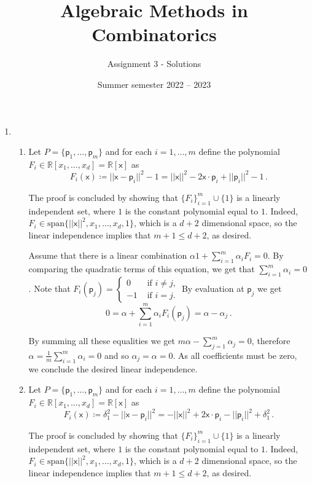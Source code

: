 \documentclass[kulak]{tplt}
\title{Algebraic Methods in Combinatorics}
\author{Assignment 3 - Solutions}
\date{Summer semester 2022 -- 2023}
\theoremstyle{definition}
\newcommand{\R}{\mathbb{R}}
\newcommand{\vx}{\mathsf{x}}
\newcommand{\vp}{\mathsf{p}}
\newcommand{\spn}{\mathrm{span}}
\begin{document}
\maketitle
\vspace{2mm}
\begin{enumerate}
\item 
\begin{enumerate}
\item
Let $P = \{\vp_1, \ldots, \vp_m \} $ and for each $i=1, \ldots, m$ define the polynomial $F_i \in \R[x_1, \ldots, x_d] = \R[\vx]$ as
$$ F_i ( \vx ) \coloneqq ||\vx - \vp_i ||^2 - 1  = ||\vx ||^2 - 2 \vx \cdot \vp_i + ||\vp_i||^2 - 1\, .$$

The proof is concluded by showing that $\{F_i\}_{i=1}^m \cup \{ 1 \}$ is a linearly independent set, where $1$ is the constant polynomial equal to $1$.
Indeed, $F_i \in \spn \{ ||\vx||^2, x_1, \ldots, x_d, 1\}$, which is a $d+2$ dimensional space, so the linear independence implies that $m+1 \leq d+2$, as desired.


Assume that there is a linear combination $\alpha 1 + \sum_{i=1}^m \alpha_i F_i = 0 $.
By comparing the quadratic terms of this equation, we get that $\sum_{i=1}^m \alpha_i = 0$.
Note that $F_i(\vp_j) = \begin{cases} 0& \text{ if $i\neq j$,} \\ -1& \text{ if $i = j$.}\end{cases}$
By evaluation at $\vp_j $ we get 
$$ 0 = \alpha + \sum_{i=1}^m \alpha_i F_i(\vp_j) = \alpha - \alpha_j\, . $$

By summing all these equalities we get $m \alpha - \sum_{j=1}^m \alpha_j = 0$, therefore $\alpha =\frac{1}{m} \sum_{i=1}^m \alpha_i = 0$ and so $\alpha_j = \alpha = 0$.
As all coefficients must be zero, we conclude the desired linear independence.

\item 
Let $P = \{\vp_1, \ldots, \vp_m \} $ and for each $i=1, \ldots, m$ define the polynomial $F_i \in \R[x_1, \ldots, x_d] = \R[\vx]$ as
$$ F_i ( \vx ) \coloneqq \delta_1^2 - ||\vx - \vp_i ||^2  = - ||\vx ||^2 + 2 \vx \cdot \vp_i - ||\vp_i||^2 + \delta_1^2\, .$$

The proof is concluded by showing that $\{F_i\}_{i=1}^m \cup \{ 1 \}$ is a linearly independent set, where $1$ is the constant polynomial equal to $1$.
Indeed, $F_i \in \spn \{ ||\vx||^2, x_1, \ldots, x_d, 1\}$, which is a $d+2$ dimensional space, so the linear independence implies that $m+1 \leq d+2$, as desired.


\end{enumerate}
\end{enumerate}
\end{document}
